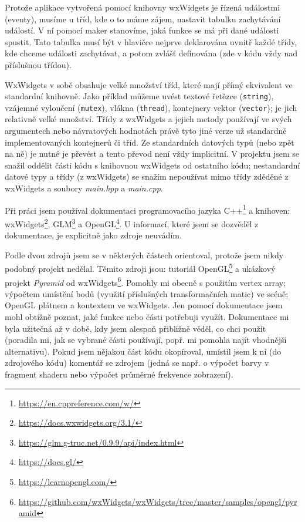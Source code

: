 \documentclass[a4paper, 11pt]{report}
\begin{document}
Protože aplikace vytvořená pomocí knihovny wxWidgets je řízená událostmi (eventy), musíme u tříd, kde o to máme zájem, nastavit tabulku zachytávání událostí. V ní pomocí maker stanovíme, jaká funkce se má při dané události spustit. Tato tabulka musí být v hlavičce nejprve deklarována uvnitř každé třídy, kde chceme události zachytávat, a potom zvlášť definována (zde v kódu vždy nad příslušnou třídou).

WxWidgets v sobě obsahuje velké množství tříd, které mají přímý ekvivalent ve standardní knihovně. Jako příklad můžeme uvést textové řetězce (\texttt{string}), vzájemné vyloučení (\texttt{mutex}), vlákna (\texttt{thread}), kontejnery vektor (\texttt{vector}); je jich relativně velké množství. Třídy z wxWidgets a jejich metody používají ve svých argumentech nebo návratových hodnotách právě tyto jiné verze už standardně implementovaných kontejnerů či tříd. Ze standardních datových typů (nebo zpět na ně) je nutné je převést a tento převod není vždy implicitní. V projektu jsem se snažil oddělit části kódu s knihovnou wxWidgets od ostatního kódu; nestandardní datové typy a třídy (z wxWidgets) se snažím nepoužívat mimo třídy zděděné z wxWidgets a soubory \emph{main.hpp} a \emph{main.cpp}.

Při práci jsem používal dokumentaci programovacího jazyka C++\footnote{\url{https://en.cppreference.com/w/}} a knihoven: wxWidgets\footnote{\url{https://docs.wxwidgets.org/3.1/}}, GLM\footnote{\url{https://glm.g-truc.net/0.9.9/api/index.html}} a OpenGL\footnote{\url{https://docs.gl/}}. U informací, které jsem se dozvěděl z dokumentace, je explicitně jako zdroje neuvádím.

Podle dvou zdrojů jsem se v některých částech orientoval, protože jsem nikdy podobný projekt nedělal. Těmito zdroji jsou: tutoriál OpenGL\footnote{\url{https://learnopengl.com/}} a ukázkový projekt \emph{Pyramid} od wxWidgets\footnote{\url{https://github.com/wxWidgets/wxWidgets/tree/master/samples/opengl/pyramid}}. Pomohly mi obecně s použitím vertex array; výpočtem umístění bodů (využití příslušných transformačních matic) ve scéně; OpenGL plátnem a kontextem ve wxWidgets. Jen pomocí dokumentace jsem mohl obtížně poznat, jaké funkce nebo části potřebuji využít. Dokumentace mi byla užitečná až v době, kdy jsem alespoň přibližně věděl, co chci použít (poradila mi, jak se vybrané části používají, popř. mi pomohla najít vhodnější alternativu). Pokud jsem nějakou část kódu okopíroval, umístil jsem k ní (do zdrojového kódu) komentář se zdrojem (jedná se např. o výpočet barvy v fragment shaderu nebo výpočet průměrné frekvence zobrazení).
\end{document}
